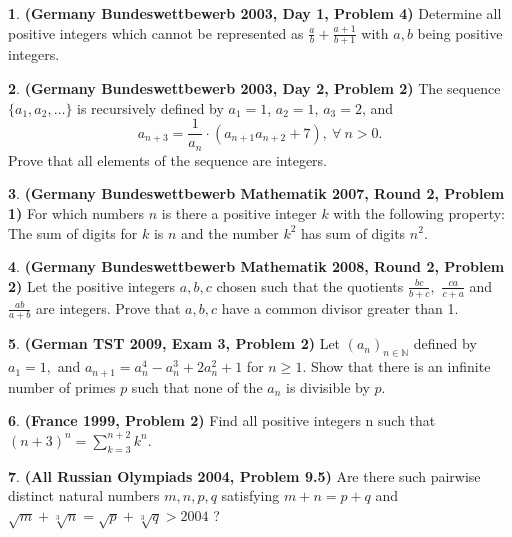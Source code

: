 \documentclass{article}
\newcommand{\plus}{+}
\newcommand{\minus}{-}
\newcommand{\equal}{=}
\theoremstyle{definition}
\newtheorem{p}{}
\begin{document}
\begin{p}{\bf (Germany Bundeswettbewerb 2003, Day 1, Problem 4)}
Determine all positive integers which cannot be represented as $\frac{a}{b}+\frac{a+1}{b+1}$ with $a,b$ being positive integers.
\end{p}


\begin{p}{\bf (Germany Bundeswettbewerb 2003, Day 2, Problem 2)}
The sequence $\{a_1,a_2,\ldots\}$ is recursively defined by  $a_1 = 1$, $a_2 = 1$, $a_3 = 2$, and \[ a_{n+3} = \frac 1{a_n}\cdot (a_{n+1}a_{n+2}+7), \ \forall \ n > 0. \] Prove that all elements of the sequence are integers.
\end{p}



\begin{p}{\bf (Germany Bundeswettbewerb Mathematik 2007, Round 2, Problem 1)}
For which numbers $ n$ is there a positive integer $ k$ with the following property: The sum of digits for $ k$ is $ n$ and the number $ k^2$ has sum of digits $ n^2.$
\end{p}





\begin{p}{\bf (Germany Bundeswettbewerb Mathematik 2008, Round 2, Problem 2)}
Let the positive integers $ a,b,c$ chosen such that the quotients $ \frac{bc}{b\plus{}c},$ $ \frac{ca}{c\plus{}a}$ and $ \frac{ab}{a\plus{}b}$ are integers. Prove that $ a,b,c$ have a common divisor greater than 1.
\end{p}





\begin{p}{\bf (German TST 2009, Exam 3, Problem 2)}
Let $ \left(a_n \right)_{n \in \mathbb{N}}$ defined by $ a_1 \equal{} 1,$ and $ a_{n \plus{} 1} \equal{} a^4_n \minus{} a^3_n \plus{} 2a^2_n \plus{} 1$ for $ n \geq 1.$ Show that there is an infinite number of primes $ p$ such that none of the $ a_n$ is divisible by $ p.$
\end{p}



\begin{p}{\bf (France 1999, Problem 2)}
Find all positive integers n such that $(n+3)^n = \sum^{n+2}_{k=3} k^n$.
\end{p}



\begin{p}{\bf (All Russian Olympiads 2004, Problem 9.5)}
Are there such pairwise distinct natural numbers $ m, n, p, q$ satisfying $ m \plus{} n \equal{} p \plus{} q$ and $ \sqrt{m} \plus{} \sqrt[3]{n} \equal{} \sqrt{p} \plus{} \sqrt[3]{q} > 2004$ ?
\end{p}
\end{document}
